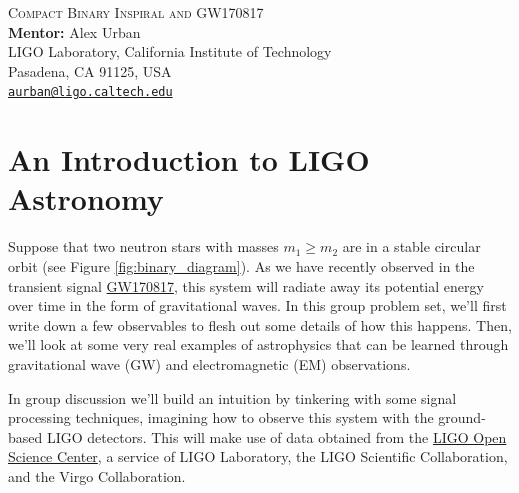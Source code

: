 \documentclass[11pt]{article}
\begin{document}
\begin{center}
{\Large\textsc{Compact Binary Inspiral and GW170817}} \\
\vspace{10pt}
{\large \textbf{Mentor:} Alex Urban} \\
{\small LIGO Laboratory, California Institute of Technology \\
Pasadena, CA 91125, USA \\
\href{mailto:aurban@ligo.caltech.edu}{\texttt{aurban@ligo.caltech.edu}}}
\end{center}


\section*{An Introduction to LIGO Astronomy}
\hspace{15pt} Suppose that two neutron stars with masses $m_1 \geq m_2$ are in a stable circular orbit (see Figure \ref{fig:binary_diagram}).
As we have recently observed in the transient signal \href{https://journals.aps.org/prl/pdf/10.1103/PhysRevLett.119.161101}{GW170817}, this
system will radiate away its potential energy over time in the form of gravitational waves. In this group problem set, we'll first write down
a few observables to flesh out some details of how this happens. Then, we'll look at some very real examples of astrophysics that can be
learned through gravitational wave (GW) and electromagnetic (EM) observations.

In group discussion we'll build an intuition by tinkering with some signal processing techniques, imagining how to observe this system with the
ground-based LIGO detectors. This will make use of data obtained from the \href{https://losc.ligo.org}{LIGO Open Science Center}, a service of
LIGO Laboratory, the LIGO Scientific Collaboration, and the Virgo Collaboration.

\vspace{20pt}
\end{document}
